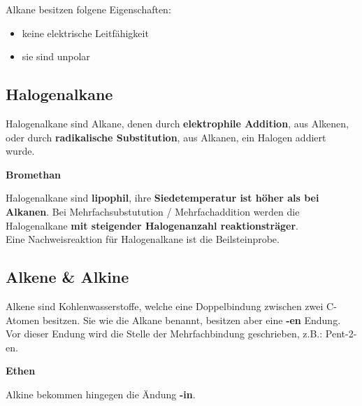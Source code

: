 \documentclass[a4paper]{article}
\begin{document}
Alkane besitzen folgene Eigenschaften:\\
\begin{itemize}
    \item{keine elektrische Leitfähigkeit}
    \item {sie sind unpolar}\\[1cm]
\end{itemize}


\subsection{Halogenalkane}

Halogenalkane sind Alkane, denen durch \textbf{elektrophile Addition}, aus Alkenen, oder durch
\textbf{radikalische Substitution}, aus Alkanen, ein Halogen addiert wurde. \\

\begin{center}
     \hspace{1cm} \textbf{Bromethan}\\[0,5cm]
\end{center}

Halogenalkane sind \textbf{lipophil}, ihre \textbf{Siedetemperatur ist höher als bei Alkanen}.
Bei Mehrfachsubstutution / Mehrfachaddition werden die Halogenalkane \textbf{mit steigender Halogenanzahl reaktionsträger}.\\

Eine Nachweisreaktion für Halogenalkane ist die Beilsteinprobe.

\subsection{Alkene \& Alkine}

Alkene sind Kohlenwasserstoffe, welche eine Doppelbindung zwischen zwei C-Atomen besitzen.
Sie wie die Alkane benannt, besitzen aber eine \textbf{-en} Endung. Vor dieser Endung wird die Stelle der Mehrfachbindung geschrieben,
z.B.: Pent-2-en.\\

\begin{center}
     \hspace{1cm} \textbf{Ethen}\\[0,5cm]
\end{center}


Alkine bekommen hingegen die Ändung \textbf{-in}.\\
\end{document}
